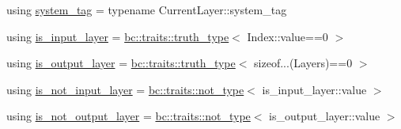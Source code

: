 \begin{DoxyCompactItemize}
\item 
using \hyperlink{structbc_1_1nn_1_1LayerChain_3_01Index_00_01Derived_00_01CurrentLayer_00_01Layers_8_8_8_01_4_aa2ed4b8879e570569a19098b367e9f71}{system\+\_\+tag} = typename Current\+Layer\+::system\+\_\+tag
\item 
using \hyperlink{structbc_1_1nn_1_1LayerChain_3_01Index_00_01Derived_00_01CurrentLayer_00_01Layers_8_8_8_01_4_a1adb271b279e22cae29459160e1eea6b}{is\+\_\+input\+\_\+layer} = \hyperlink{namespacebc_1_1traits_ac91a9795000ae7f483efbaf74c9872e8}{bc\+::traits\+::truth\+\_\+type}$<$ Index\+::value==0 $>$
\item 
using \hyperlink{structbc_1_1nn_1_1LayerChain_3_01Index_00_01Derived_00_01CurrentLayer_00_01Layers_8_8_8_01_4_acc9ed5808518bd764d3d73a68be9f13d}{is\+\_\+output\+\_\+layer} = \hyperlink{namespacebc_1_1traits_ac91a9795000ae7f483efbaf74c9872e8}{bc\+::traits\+::truth\+\_\+type}$<$ sizeof...(Layers)==0 $>$
\item 
using \hyperlink{structbc_1_1nn_1_1LayerChain_3_01Index_00_01Derived_00_01CurrentLayer_00_01Layers_8_8_8_01_4_a5085bd4b28b83b7e203f1f1cb069a4df}{is\+\_\+not\+\_\+input\+\_\+layer} = \hyperlink{namespacebc_1_1traits_a27454511d91930df60d099d9afdf46ff}{bc\+::traits\+::not\+\_\+type}$<$ is\+\_\+input\+\_\+layer\+::value $>$
\item 
using \hyperlink{structbc_1_1nn_1_1LayerChain_3_01Index_00_01Derived_00_01CurrentLayer_00_01Layers_8_8_8_01_4_ad83d7d4191587c32c3ea69a3d8a25b53}{is\+\_\+not\+\_\+output\+\_\+layer} = \hyperlink{namespacebc_1_1traits_a27454511d91930df60d099d9afdf46ff}{bc\+::traits\+::not\+\_\+type}$<$ is\+\_\+output\+\_\+layer\+::value $>$
\end{DoxyCompactItemize}
